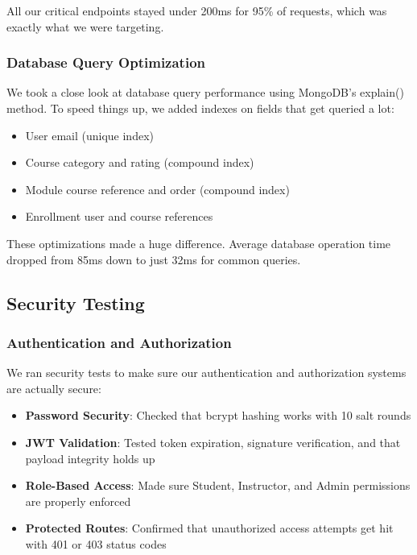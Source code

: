 \documentclass[final,3p,times,twocolumn]{elsarticle}
\begin{document}
All our critical endpoints stayed under 200ms for 95\% of requests, which was exactly what we were targeting.

\subsubsection{Database Query Optimization}

We took a close look at database query performance using MongoDB's explain() method. To speed things up, we added indexes on fields that get queried a lot:

\begin{itemize}
    \item User email (unique index)
    \item Course category and rating (compound index)
    \item Module course reference and order (compound index)
    \item Enrollment user and course references
\end{itemize}

These optimizations made a huge difference. Average database operation time dropped from 85ms down to just 32ms for common queries.

\subsection{Security Testing}

\subsubsection{Authentication and Authorization}

We ran security tests to make sure our authentication and authorization systems are actually secure:

\begin{itemize}
    \item \textbf{Password Security}: Checked that bcrypt hashing works with 10 salt rounds
    \item \textbf{JWT Validation}: Tested token expiration, signature verification, and that payload integrity holds up
    \item \textbf{Role-Based Access}: Made sure Student, Instructor, and Admin permissions are properly enforced
    \item \textbf{Protected Routes}: Confirmed that unauthorized access attempts get hit with 401 or 403 status codes
\end{itemize}
\end{document}
